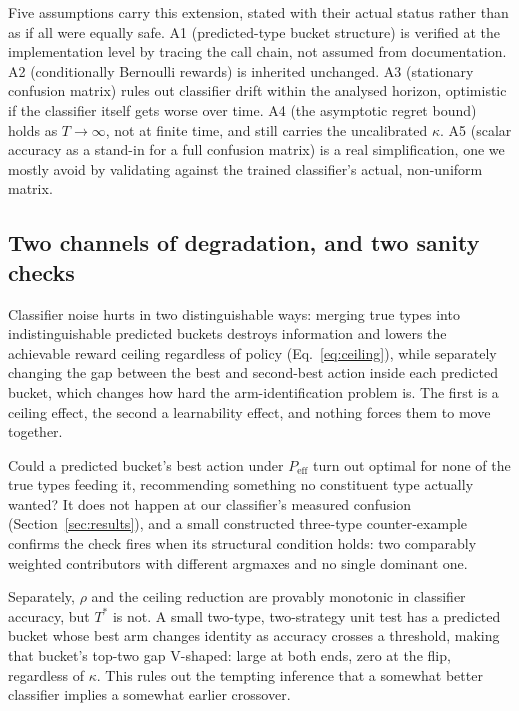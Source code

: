 \documentclass[conference]{IEEEtran}
\begin{document}
Five assumptions carry this extension, stated with their actual status
rather than as if all were equally safe. A1 (predicted-type bucket
structure) is verified at the implementation level by tracing the call
chain, not assumed from documentation. A2 (conditionally Bernoulli
rewards) is inherited unchanged. A3 (stationary confusion matrix) rules
out classifier drift within the analysed horizon, optimistic if the
classifier itself gets worse over time. A4 (the asymptotic regret bound)
holds as $T \to \infty$, not at finite time, and still carries the
uncalibrated $\kappa$. A5 (scalar accuracy as a stand-in for a full
confusion matrix) is a real simplification, one we mostly avoid by
validating against the trained classifier's actual, non-uniform matrix.

\subsection{Two channels of degradation, and two sanity checks}

Classifier noise hurts in two distinguishable ways: merging true types
into indistinguishable predicted buckets destroys information and lowers
the achievable reward ceiling regardless of policy (Eq.~\ref{eq:ceiling}),
while separately changing the gap between the best and second-best action
inside each predicted bucket, which changes how hard the
arm-identification problem is. The first is a ceiling effect, the second
a learnability effect, and nothing forces them to move together.

Could a predicted bucket's best action under $P_{\mathrm{eff}}$ turn out
optimal for none of the true types feeding it, recommending something no
constituent type actually wanted? It does not happen at our classifier's
measured confusion (Section~\ref{sec:results}), and a small constructed
three-type counter-example confirms the check fires when its structural
condition holds: two comparably weighted contributors with different
argmaxes and no single dominant one.

Separately, $\rho$ and the ceiling reduction are provably monotonic in
classifier accuracy, but $T^*$ is not. A small two-type, two-strategy
unit test has a predicted bucket whose best arm changes identity as
accuracy crosses a threshold, making that bucket's top-two gap V-shaped:
large at both ends, zero at the flip, regardless of $\kappa$. This rules
out the tempting inference that a somewhat better classifier implies a
somewhat earlier crossover.
\end{document}
